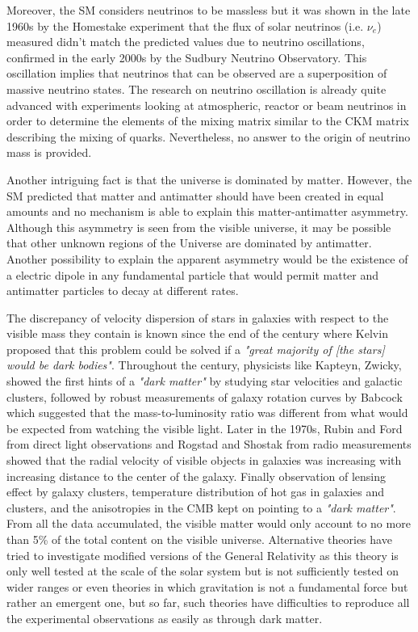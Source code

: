 	Moreover, the SM considers neutrinos to be massless but it was shown in the late 1960s by the Homestake experiment that the flux of solar neutrinos (i.e. $\nu_e$) measured didn't match the predicted values due to neutrino oscillations, confirmed in the early 2000s by the Sudbury Neutrino Observatory. This oscillation implies that neutrinos that can be observed are a superposition of massive neutrino states. The research on neutrino oscillation is already quite advanced with experiments looking at atmospheric, reactor or beam neutrinos in order to determine the elements of the mixing matrix similar to the CKM matrix describing the mixing of quarks. Nevertheless, no answer to the origin of neutrino mass is provided.
	
	Another intriguing fact is that the universe is dominated by matter. However, the SM predicted that matter and antimatter should have been created in equal amounts and no mechanism is able to explain this matter-antimatter asymmetry. Although this asymmetry is seen from the visible universe, it may be possible that other unknown regions of the Universe are dominated by antimatter. Another possibility to explain the apparent asymmetry would be the existence of a electric dipole in any fundamental particle that would permit matter and antimatter particles to decay at different rates.
	
	The discrepancy of velocity dispersion of stars in galaxies with respect to the visible mass they contain is known since the end of the  century where Kelvin proposed that this problem could be solved if a \textit{"great majority of [the stars] would be dark bodies"}. Throughout the  century, physicists like Kapteyn, Zwicky, showed the first hints of a \textit{"dark matter"} by studying star velocities and galactic clusters, followed by robust measurements of galaxy rotation curves by Babcock which suggested that the mass-to-luminosity ratio was different from what would be expected from watching the visible light. Later in the 1970s, Rubin and Ford from direct light observations and Rogstad and Shostak from radio measurements showed that the radial velocity of visible objects in galaxies was increasing with increasing distance to the center of the galaxy. Finally observation of lensing effect by galaxy clusters, temperature distribution of hot gas in galaxies and clusters, and the anisotropies in the \acf{CMB} kept on pointing to a \textit{"dark matter"}. From all the data accumulated, the visible matter would only account to no more than 5\% of the total content on the visible universe. Alternative theories have tried to investigate modified versions of the General Relativity as this theory is only well tested at the scale of the solar system but is not sufficiently tested on wider ranges or even theories in which gravitation is not a fundamental force but rather an emergent one, but so far, such theories have difficulties to reproduce all the experimental observations as easily as through dark matter.
	
